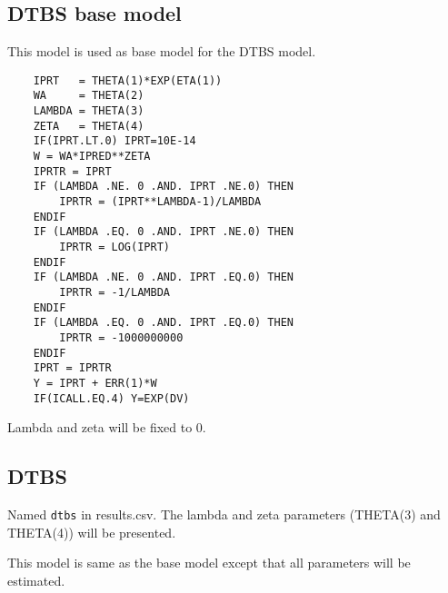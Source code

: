 \subsection{DTBS base model}
This model is used as base model for the DTBS model.
\begin{verbatim}
    IPRT   = THETA(1)*EXP(ETA(1))
	WA     = THETA(2)
	LAMBDA = THETA(3)
	ZETA   = THETA(4)
	IF(IPRT.LT.0) IPRT=10E-14
	W = WA*IPRED**ZETA
	IPRTR = IPRT
	IF (LAMBDA .NE. 0 .AND. IPRT .NE.0) THEN
		IPRTR = (IPRT**LAMBDA-1)/LAMBDA
	ENDIF
	IF (LAMBDA .EQ. 0 .AND. IPRT .NE.0) THEN
		IPRTR = LOG(IPRT)
	ENDIF
	IF (LAMBDA .NE. 0 .AND. IPRT .EQ.0) THEN
		IPRTR = -1/LAMBDA
	ENDIF
	IF (LAMBDA .EQ. 0 .AND. IPRT .EQ.0) THEN
		IPRTR = -1000000000
	ENDIF
	IPRT = IPRTR
	Y = IPRT + ERR(1)*W
	IF(ICALL.EQ.4) Y=EXP(DV)
\end{verbatim}

Lambda and zeta will be fixed to 0.

\subsection{DTBS}
Named \verb|dtbs| in results.csv. The lambda and zeta parameters (THETA(3) and THETA(4)) will be presented.

This model is same as the base model except that all parameters will be estimated.


